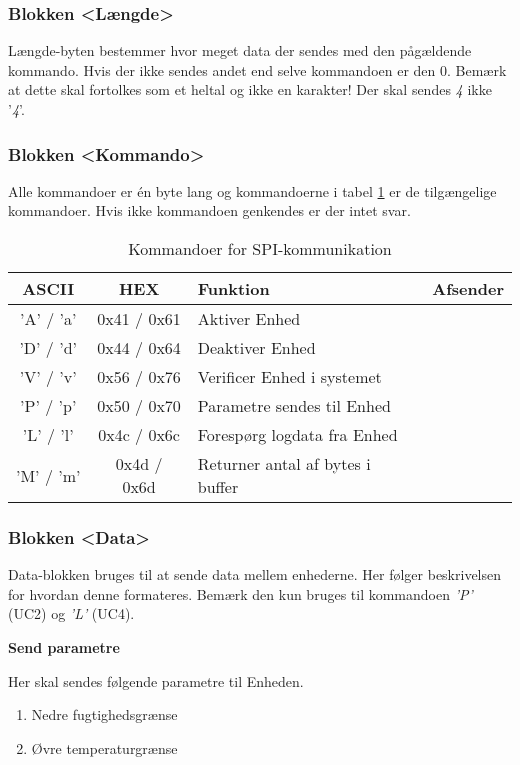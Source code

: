 \subsubsection*{Blokken <Længde>}
Længde-byten bestemmer hvor meget data der sendes med den pågældende kommando.
Hvis der ikke sendes andet end selve kommandoen er den 0. Bemærk at dette skal fortolkes som et heltal og ikke en karakter! Der skal sendes \textit{4} ikke '\textit{4}'.

\subsubsection*{Blokken <Kommando>}
Alle kommandoer er én byte lang og kommandoerne i tabel \ref{tabel:SWProtokol-kommandoer} er de tilgængelige kommandoer. Hvis ikke kommandoen genkendes er der intet svar.

\begin{table}[h]
\caption{Kommandoer for SPI-kommunikation}
\centering
\begin{tabular}{|c|c|l|c|}
\hline 
\textbf{ASCII} & \textbf{HEX} & \textbf{Funktion} & \textbf{Afsender}\\ 
\hline 
'A' / 'a' & 0x41 / 0x61 & Aktiver Enhed\\ 
\hline 
'D' / 'd' & 0x44 / 0x64 & Deaktiver Enhed\\ 
\hline 
'V' / 'v' & 0x56 / 0x76 & Verificer Enhed i systemet\\ 
\hline 
'P' / 'p' & 0x50 / 0x70 & Parametre sendes til Enhed\\ 
\hline
'L' / 'l' & 0x4c / 0x6c & Forespørg logdata fra Enhed\\ 
\hline
'M' / 'm' & 0x4d / 0x6d & Returner antal af bytes i buffer\\ 
\hline
\end{tabular}
\label{tabel:SWProtokol-kommandoer}
\end{table} 

\subsubsection*{Blokken <Data>}
Data-blokken bruges til at sende data mellem enhederne. Her følger beskrivelsen for hvordan denne formateres. Bemærk den kun bruges til kommandoen \textit{'P'} (UC2) og \textit{'L'} (UC4).

\textbf{Send parametre}

Her skal sendes følgende parametre til Enheden.

\begin{enumerate}
	\item Nedre fugtighedsgrænse
	\item Øvre temperaturgrænse
\end{enumerate}


